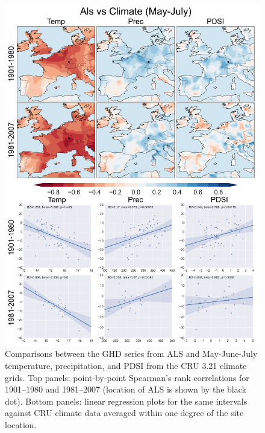 \documentclass[12pt]{article}
\begin{document}
\begin{figure}
\center
\includegraphics[width=.9\columnwidth,scale=2]{SUPP_fig_04_Als_MJJ_climate_onedeg_withtrend.png}
\caption{Comparisons between the GHD series from ALS and May-June-July temperature, precipitation, and PDSI from the CRU 3.21 climate grids. Top panels: point-by-point Spearman's rank correlations for 1901--1980 and 1981--2007 (location of ALS is shown by the black dot). Bottom panels: linear regression plots for the same intervals against CRU climate data averaged within one degree of the site location.}
\end{figure}
\end{document}
